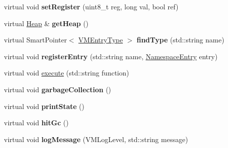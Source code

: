 \begin{DoxyCompactItemize}
\item 
\hypertarget{class_v_m_1_1_virtual_machine_af4da2b5077db8bad2574b35bc1a2bb31}{virtual void {\bfseries set\-Register} (uint8\-\_\-t reg, long val, bool ref)}\label{class_v_m_1_1_virtual_machine_af4da2b5077db8bad2574b35bc1a2bb31}

\item 
\hypertarget{class_v_m_1_1_virtual_machine_a30fb1469c9f436093c06529b257abfb8}{virtual \hyperlink{class_v_m_1_1_heap}{Heap} \& {\bfseries get\-Heap} ()}\label{class_v_m_1_1_virtual_machine_a30fb1469c9f436093c06529b257abfb8}

\item 
\hypertarget{class_v_m_1_1_virtual_machine_a7b26ef866e71358c8ffd4ea133bd15c6}{virtual Smart\-Pointer$<$ \hyperlink{class_v_m_1_1_v_m_entry_type}{V\-M\-Entry\-Type} $>$ {\bfseries find\-Type} (std\-::string name)}\label{class_v_m_1_1_virtual_machine_a7b26ef866e71358c8ffd4ea133bd15c6}

\item 
\hypertarget{class_v_m_1_1_virtual_machine_afe501e1ac466c1799cbbc32db282fdf1}{virtual void {\bfseries register\-Entry} (std\-::string name, \hyperlink{class_v_m_1_1_namespace_entry}{Namespace\-Entry} entry)}\label{class_v_m_1_1_virtual_machine_afe501e1ac466c1799cbbc32db282fdf1}

\item 
virtual void \hyperlink{class_v_m_1_1_virtual_machine_addc13d6dc68198f867b7ff8e21746af7}{execute} (std\-::string function)
\item 
\hypertarget{class_v_m_1_1_virtual_machine_a8853383f555a506d8ee35b68683e18db}{virtual void {\bfseries garbage\-Collection} ()}\label{class_v_m_1_1_virtual_machine_a8853383f555a506d8ee35b68683e18db}

\item 
\hypertarget{class_v_m_1_1_virtual_machine_a3f19073759247713fb74a1f32f9c66cc}{virtual void {\bfseries print\-State} ()}\label{class_v_m_1_1_virtual_machine_a3f19073759247713fb74a1f32f9c66cc}

\item 
\hypertarget{class_v_m_1_1_virtual_machine_aadc8e41bda5ca137388e7dc6e34c48c1}{virtual void {\bfseries hit\-Gc} ()}\label{class_v_m_1_1_virtual_machine_aadc8e41bda5ca137388e7dc6e34c48c1}

\item 
\hypertarget{class_v_m_1_1_virtual_machine_a3b45f03fa8a5898a19b1afde2e6f68ba}{virtual void {\bfseries log\-Message} (V\-M\-Log\-Level, std\-::string message)}\label{class_v_m_1_1_virtual_machine_a3b45f03fa8a5898a19b1afde2e6f68ba}

\end{DoxyCompactItemize}


